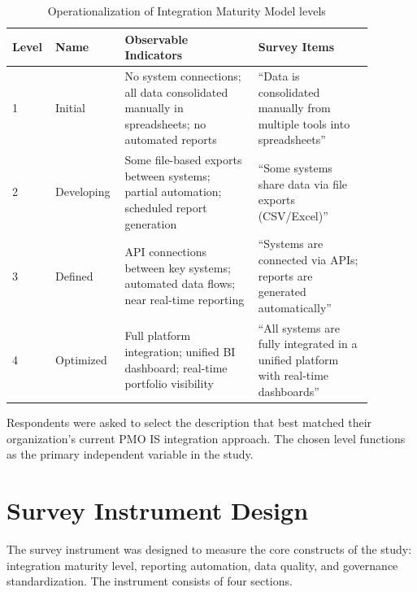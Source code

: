 {\singlespacing
\begin{table}[h]
  \caption{Operationalization of Integration Maturity Model levels}
  \label{tab:imm-operationalization}
  \centering
  \begin{tabular}{p{0.08\linewidth}p{0.15\linewidth}p{0.35\linewidth}p{0.30\linewidth}}
    \toprule
    \textbf{Level} & \textbf{Name} & \textbf{Observable Indicators} &
    \textbf{Survey Items}\\
    \midrule
    1 & Initial & No system connections; all data consolidated manually in
    spreadsheets; no automated reports &
    ``Data is consolidated manually from multiple tools into spreadsheets''\\
    2 & Developing & Some file-based exports between systems; partial
    automation; scheduled report generation &
    ``Some systems share data via file exports (CSV/Excel)''\\
    3 & Defined & API connections between key systems; automated data flows;
    near real-time reporting &
    ``Systems are connected via APIs; reports are generated automatically''\\
    4 & Optimized & Full platform integration; unified BI dashboard;
    real-time portfolio visibility &
    ``All systems are fully integrated in a unified platform with real-time dashboards''\\
    \bottomrule
  \end{tabular}
\end{table}
}

Respondents were asked to select the description that best matched their
organization's current PMO IS integration approach. The chosen level functions
as the primary independent variable in the study.

\section{Survey Instrument Design}
\label{sec:survey}

The survey instrument was designed to measure the core constructs of the study:
integration maturity level, reporting automation, data quality, and governance
standardization. The instrument consists of four sections.

